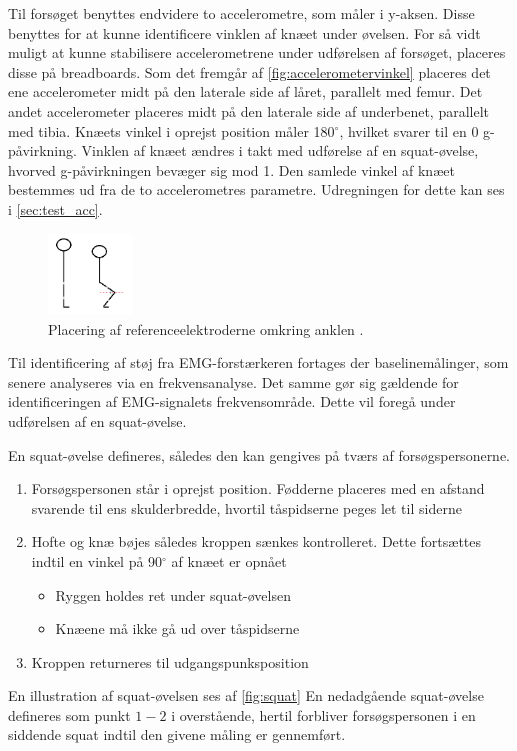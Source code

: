 Til forsøget benyttes endvidere to accelerometre, som måler i y-aksen. Disse benyttes for at kunne identificere vinklen af knæet under øvelsen. For så vidt muligt at kunne stabilisere accelerometrene under udførelsen af forsøget, placeres disse på breadboards. 
Som det fremgår af \autoref{fig:accelerometervinkel} placeres det ene accelerometer midt på den laterale side af låret, parallelt med femur. Det andet accelerometer placeres midt på den laterale side af underbenet, parallelt med tibia. Knæets vinkel i oprejst position måler 180$^{\circ}$, hvilket svarer til en 0 g-påvirkning. Vinklen af knæet ændres i takt med udførelse af en squat-øvelse, hvorved g-påvirkningen bevæger sig mod 1. Den samlede vinkel af knæet bestemmes ud fra de to accelerometres parametre. Udregningen for dette kan ses i \autoref{sec:test_acc}.

\begin{figure}[H]
\centering
\includegraphics[width=0.2\textwidth]{figures/accelerometervinkel.png}
\caption{Placering af referenceelektroderne omkring anklen \citep{ankle2016}.}
\label{fig:accelerometervinkel}
\end{figure}


Til identificering af støj fra EMG-forstærkeren fortages der baselinemålinger, som senere analyseres via en frekvensanalyse. Det samme gør sig gældende for identificeringen af EMG-signalets frekvensområde. Dette vil foregå under udførelsen af en squat-øvelse.  

En squat-øvelse defineres, således den kan gengives på tværs af forsøgspersonerne.
\begin{enumerate}
\item Forsøgspersonen står i oprejst position. Fødderne placeres med en afstand svarende til ens skulderbredde, hvortil tåspidserne peges let til siderne
\item Hofte og knæ bøjes således kroppen sænkes kontrolleret. Dette fortsættes indtil en vinkel på 90$^{\circ}$ af knæet er opnået
	\begin{itemize}
	\item Ryggen holdes ret under squat-øvelsen 
	\item Knæene må ikke gå ud over tåspidserne 
	\end{itemize}
\item Kroppen returneres til udgangspunksposition
\end{enumerate}
En illustration af squat-øvelsen ses af \autoref{fig:squat}
En nedadgående squat-øvelse defineres som punkt $1-2$ i overstående, hertil forbliver forsøgspersonen i en siddende squat indtil den givene måling er gennemført.

